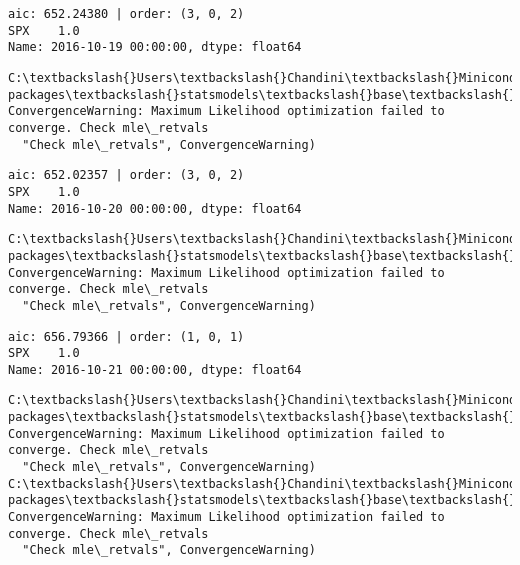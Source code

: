 \documentclass[11pt]{article}
\begin{document}
    \begin{Verbatim}[commandchars=\\\{\}]
aic: 652.24380 | order: (3, 0, 2)
SPX    1.0
Name: 2016-10-19 00:00:00, dtype: float64

    \end{Verbatim}

    \begin{Verbatim}[commandchars=\\\{\}]
C:\textbackslash{}Users\textbackslash{}Chandini\textbackslash{}Miniconda3\textbackslash{}envs\textbackslash{}auquan\textbackslash{}lib\textbackslash{}site-packages\textbackslash{}statsmodels\textbackslash{}base\textbackslash{}model.py:496: ConvergenceWarning: Maximum Likelihood optimization failed to converge. Check mle\_retvals
  "Check mle\_retvals", ConvergenceWarning)

    \end{Verbatim}

    \begin{Verbatim}[commandchars=\\\{\}]
aic: 652.02357 | order: (3, 0, 2)
SPX    1.0
Name: 2016-10-20 00:00:00, dtype: float64

    \end{Verbatim}

    \begin{Verbatim}[commandchars=\\\{\}]
C:\textbackslash{}Users\textbackslash{}Chandini\textbackslash{}Miniconda3\textbackslash{}envs\textbackslash{}auquan\textbackslash{}lib\textbackslash{}site-packages\textbackslash{}statsmodels\textbackslash{}base\textbackslash{}model.py:496: ConvergenceWarning: Maximum Likelihood optimization failed to converge. Check mle\_retvals
  "Check mle\_retvals", ConvergenceWarning)

    \end{Verbatim}

    \begin{Verbatim}[commandchars=\\\{\}]
aic: 656.79366 | order: (1, 0, 1)
SPX    1.0
Name: 2016-10-21 00:00:00, dtype: float64

    \end{Verbatim}

    \begin{Verbatim}[commandchars=\\\{\}]
C:\textbackslash{}Users\textbackslash{}Chandini\textbackslash{}Miniconda3\textbackslash{}envs\textbackslash{}auquan\textbackslash{}lib\textbackslash{}site-packages\textbackslash{}statsmodels\textbackslash{}base\textbackslash{}model.py:496: ConvergenceWarning: Maximum Likelihood optimization failed to converge. Check mle\_retvals
  "Check mle\_retvals", ConvergenceWarning)
C:\textbackslash{}Users\textbackslash{}Chandini\textbackslash{}Miniconda3\textbackslash{}envs\textbackslash{}auquan\textbackslash{}lib\textbackslash{}site-packages\textbackslash{}statsmodels\textbackslash{}base\textbackslash{}model.py:496: ConvergenceWarning: Maximum Likelihood optimization failed to converge. Check mle\_retvals
  "Check mle\_retvals", ConvergenceWarning)

    \end{Verbatim}
\end{document}
